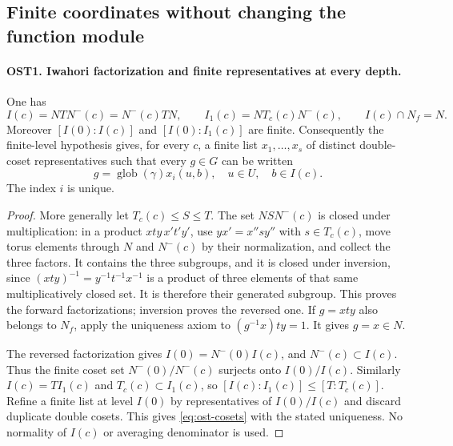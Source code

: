 \subsection{Finite coordinates without changing the function module}

\paragraph{OST1. Iwahori factorization and finite representatives at every depth.}
\label{claim:OST1}
One has
\[
 I(c)=NTN^-(c)=N^-(c)TN,\qquad
 I_1(c)=NT_c(c)N^-(c),\qquad I(c)\cap N_f=N.
\]
Moreover $[I(0):I(c)]$ and $[I(0):I_1(c)]$ are finite.
Consequently the finite-level hypothesis gives, for every $c$, a
finite list $x_1,\ldots,x_s$ of distinct double-coset representatives
such that every $g\in G$ can be written
\begin{equation}\label{eq:ost-cosets}
             g=\operatorname{glob}(\gamma)x_i(u,b),
                       \quad u\in U,\quad b\in I(c).
\end{equation}
The index $i$ is unique.
\begin{proof}
More generally let $T_c(c)\leq S\leq T$.  The set $NSN^-(c)$
is closed under multiplication: in a product $xty\,x't'y'$, use
$yx'=x''s y''$ with $s\in T_c(c)$, move torus elements through
$N$ and $N^-(c)$ by their normalization, and collect the three
factors.  It contains the three subgroups, and it is closed under
inversion, since $(xty)^{-1}=y^{-1}t^{-1}x^{-1}$ is a product
of three elements of that same multiplicatively closed set.
It is therefore their generated subgroup.  This proves the forward
factorizations; inversion proves the reversed one.  If $g=xty$
also belongs to $N_f$, apply the uniqueness axiom to
$(g^{-1}x)ty=1$.  It gives $g=x\in N$.

The reversed factorization gives $I(0)=N^-(0)I(c)$, and
$N^-(c)\subset I(c)$.  Thus the finite coset set
$N^-(0)/N^-(c)$ surjects onto $I(0)/I(c)$.
Similarly $I(c)=T I_1(c)$ and $T_c(c)\subset I_1(c)$, so
$[I(c):I_1(c)]\leq[T:T_c(c)]$.
Refine a finite list at level $I(0)$ by representatives of
$I(0)/I(c)$ and discard duplicate double cosets.  This gives
\eqref{eq:ost-cosets} with the stated uniqueness.  No normality
of $I(c)$ or averaging denominator is used.
\end{proof}

